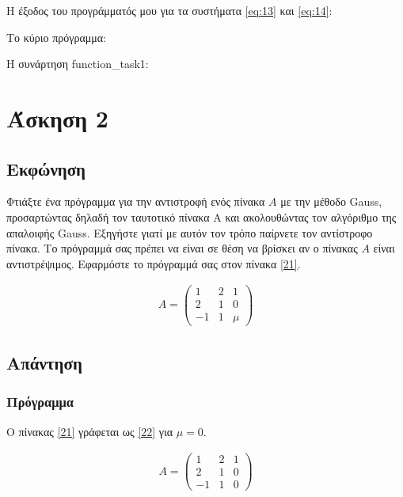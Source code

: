 \documentclass[12pt]{extreport}
\begin{document}
Η έξοδος του προγράμματός μου για τα συστήματα \eqref{eq:13} και \eqref{eq:14}:


\newpage
Το κύριο πρόγραμμα:


\newpage
Η συνάρτηση function\_task1:\label{function_task1}


\chapter{Άσκηση 2}
\section{Εκφώνηση}

Φτιάξτε ένα πρόγραμμα για την αντιστροφή ενός πίνακα $A$ με την μέθοδο Gauss, προσαρτώντας δηλαδή τον ταυτοτικό πίνακα Α και ακολουθώντας τον αλγόριθμο της απαλοιφής Gauss. Εξηγήστε γιατί με αυτόν τον τρόπο παίρνετε τον αντίστροφο πίνακα. Το πρόγραμμά σας πρέπει να είναι σε θέση να βρίσκει αν ο πίνακας $A$ είναι αντιστρέψιμος. Εφαρμόστε το πρόγραμμά σας στον πίνακα \eqref{21}.

\begin{equation}
    \begin{aligned}
        A = \begin{pmatrix}
            1  & 2 & 1   \\
            2  & 1 & 0   \\
            -1 & 1 & \mu
        \end{pmatrix}\label{21}
    \end{aligned}
\end{equation}


\newpage
\section{Απάντηση}

\subsection{Πρόγραμμα}

Ο πίνακας \eqref{21} γράφεται ως \eqref{22} για $\mu = 0$.

\begin{equation}
    \begin{aligned}
        A = \begin{pmatrix}
            1  & 2 & 1 \\
            2  & 1 & 0 \\
            -1 & 1 & 0
        \end{pmatrix}\label{22}
    \end{aligned}
\end{equation}
\end{document}
